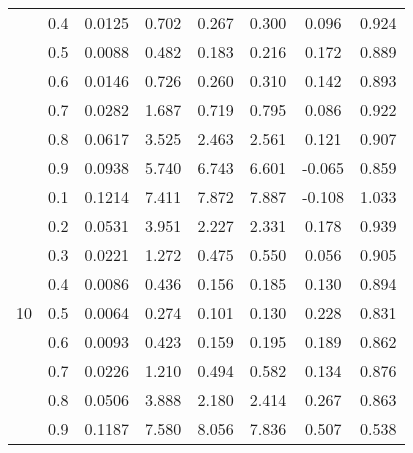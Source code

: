 \documentclass[11pt,a4paper]{report}
\begin{document}
\begin{longtable}{ | c | c || c | c | c | c | c | c | }
 & 0.4 & 0.0125 & 0.702 & 0.267 & 0.300 & 0.096 & 0.924 \\
 & 0.5 & 0.0088 & 0.482 & 0.183 & 0.216 & 0.172 & 0.889 \\
 & 0.6 & 0.0146 & 0.726 & 0.260 & 0.310 & 0.142 & 0.893 \\
 & 0.7 & 0.0282 & 1.687 & 0.719 & 0.795 & 0.086 & 0.922 \\
 & 0.8 & 0.0617 & 3.525 & 2.463 & 2.561 & 0.121 & 0.907 \\
 & 0.9 & 0.0938 & 5.740 & 6.743 & 6.601 & -0.065 & 0.859 \\
 \hline
\multirow{9}{*}{10} & 0.1 & 0.1214 & 7.411 & 7.872 & 7.887 & -0.108 & 1.033 \\
 & 0.2 & 0.0531 & 3.951 & 2.227 & 2.331 & 0.178 & 0.939 \\
 & 0.3 & 0.0221 & 1.272 & 0.475 & 0.550 & 0.056 & 0.905 \\
 & 0.4 & 0.0086 & 0.436 & 0.156 & 0.185 & 0.130 & 0.894 \\
 & 0.5 & 0.0064 & 0.274 & 0.101 & 0.130 & 0.228 & 0.831 \\
 & 0.6 & 0.0093 & 0.423 & 0.159 & 0.195 & 0.189 & 0.862 \\
 & 0.7 & 0.0226 & 1.210 & 0.494 & 0.582 & 0.134 & 0.876 \\
 & 0.8 & 0.0506 & 3.888 & 2.180 & 2.414 & 0.267 & 0.863 \\
 & 0.9 & 0.1187 & 7.580 & 8.056 & 7.836 & 0.507 & 0.538 \\
 \hline
\hline
\end{longtable}
\end{document}
